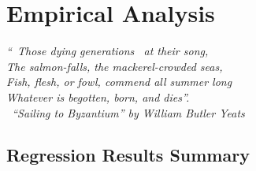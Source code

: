 \chapter{Empirical Analysis}

\textit{``\textendash\ Those dying generations \textendash\ at their song,\\
The salmon-falls, the mackerel-crowded seas,\\
Fish, flesh, or fowl, commend all summer long\\
Whatever is begotten, born, and dies''.\\
\textemdash\ ``Sailing to Byzantium'' by William Butler Yeats }

\vspace{.2cm}

\section{Regression Results Summary}


